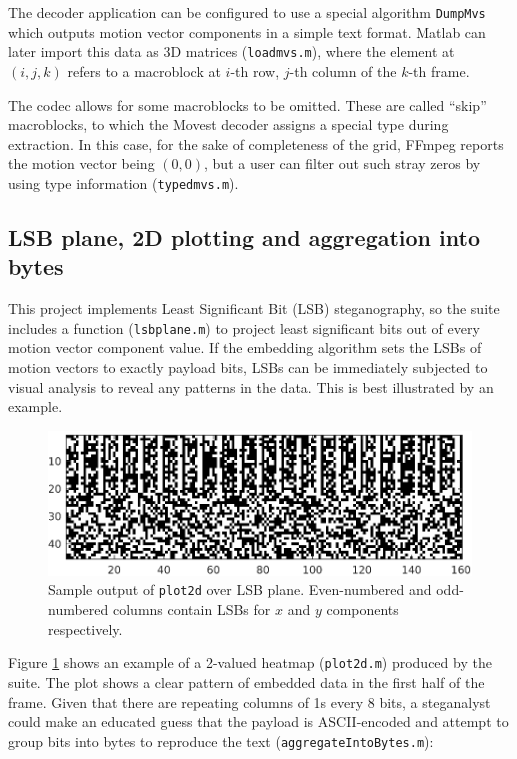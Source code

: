 \documentclass[12pt,british,twoside,notitlepage,usenames,dvipsnames,hypens,final]{report}
\numberwithin{equation}{section}
\numberwithin{figure}{section}
\begin{document}
The decoder application can be configured to use a special algorithm \texttt{DumpMvs} which outputs motion vector components in a simple text format. Matlab can later import this data as 3D matrices (\texttt{loadmvs.m}), where the element at $(i, j, k)$ refers to a macroblock at $i$-th row, $j$-th column of the $k$-th frame. 

The codec allows for some macroblocks to be omitted. These are called ``skip'' macroblocks, to which the Movest decoder assigns a special type during extraction. In this case, for the sake of completeness of the grid, FFmpeg reports the motion vector being $(0, 0)$, but a user can filter out such stray zeros by using type information (\texttt{typedmvs.m}).

\subsection{LSB plane, 2D plotting and aggregation into bytes}

This project implements Least Significant Bit (LSB) steganography, so the suite includes a function (\texttt{lsbplane.m}) to project least significant bits out of every motion vector component value. If the embedding algorithm sets the LSBs of motion vectors to exactly payload bits, LSBs can be immediately subjected to visual analysis to reveal any patterns in the data. This is best illustrated by an example.

\begin{figure}[tbh]
\centerline{\includegraphics{img/unencrypted-enc.eps}}
\caption{Sample output of \texttt{plot2d} over LSB plane. Even-numbered and odd-numbered columns contain LSBs for $x$ and $y$ components respectively.}
\label{fig:unencrypted-enc}
\end{figure}

Figure \ref{fig:unencrypted-enc} shows an example of a 2-valued heatmap (\texttt{plot2d.m}) produced by the suite. The plot shows a clear pattern of embedded data in the first half of the frame. Given that there are repeating columns of 1s every 8 bits, a steganalyst could make an educated guess that the payload is ASCII-encoded and attempt to group bits into bytes to reproduce the text (\texttt{aggregateIntoBytes.m}):
\end{document}
